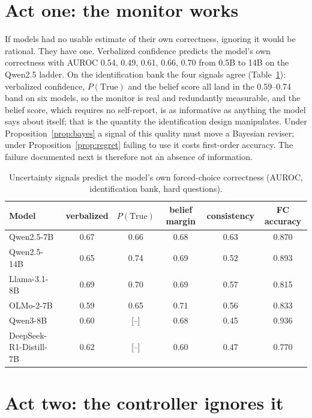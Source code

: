 \documentclass{article}
\newcommand{\pending}[1]{\textcolor{blue!70!black}{[#1]}}
\begin{document}
\section{Act one: the monitor works}\label{sec:monitor}
If models had no usable estimate of their own correctness, ignoring it would be rational. They have one. Verbalized confidence predicts the model's own correctness with AUROC 0.54, 0.49, 0.61, 0.66, 0.70 from 0.5B to 14B on the Qwen2.5 ladder. On the identification bank the four signals agree (Table~\ref{tab:monitor}): verbalized confidence, $P(\mathrm{True})$ and the belief score all land in the 0.59--0.74 band on six models, so the monitor is real and redundantly measurable, and the belief score, which requires no self-report, is as informative as anything the model says about itself; that is the quantity the identification design manipulates. Under Proposition~\ref{prop:bayes} a signal of this quality must move a Bayesian reviser; under Proposition~\ref{prop:regret} failing to use it costs first-order accuracy. The failure documented next is therefore not an absence of information.
\begin{table}[t]\centering\scriptsize\setlength{\tabcolsep}{5pt}
\begin{tabular}{lccccc}
\toprule
Model & verbalized & $P(\mathrm{True})$ & belief margin & consistency & FC accuracy \\
\midrule
Qwen2.5-7B & 0.67 & 0.66 & 0.68 & 0.63 & 0.870 \\
Qwen2.5-14B & 0.65 & 0.74 & 0.69 & 0.52 & 0.893 \\
Llama-3.1-8B & 0.69 & 0.70 & 0.69 & 0.57 & 0.815 \\
OLMo-2-7B & 0.59 & 0.65 & 0.71 & 0.56 & 0.833 \\
Qwen3-8B & 0.60 & \pending{--} & 0.68 & 0.45 & 0.936 \\
DeepSeek-R1-Distill-7B & 0.62 & \pending{--} & 0.60 & 0.47 & 0.770 \\
\bottomrule
\end{tabular}
\caption{Uncertainty signals predict the model's own forced-choice correctness (AUROC, identification bank, hard questions).}
\label{tab:monitor}
\end{table}

\section{Act two: the controller ignores it}\label{sec:control}
\end{document}
